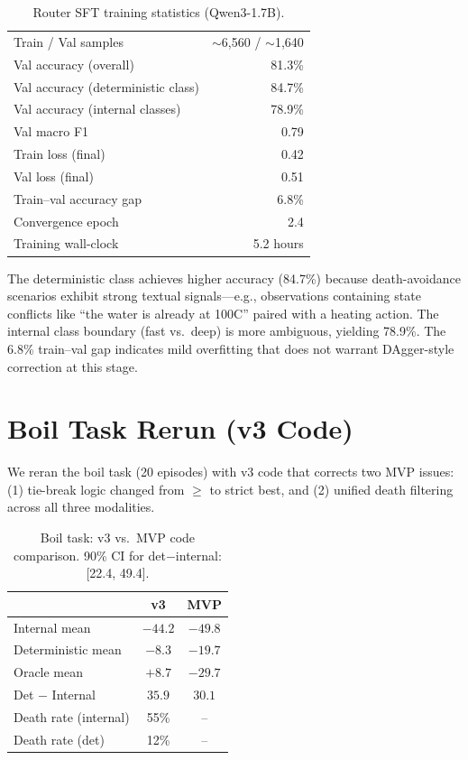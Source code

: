 \documentclass[11pt,a4paper]{article}
\begin{document}
\begin{table}[h]
\centering
\small
\begin{tabular}{lr}
\toprule
Train / Val samples & $\sim$6,560 / $\sim$1,640 \\
Val accuracy (overall) & 81.3\% \\
Val accuracy (deterministic class) & 84.7\% \\
Val accuracy (internal classes) & 78.9\% \\
Val macro F1 & 0.79 \\
Train loss (final) & 0.42 \\
Val loss (final) & 0.51 \\
Train--val accuracy gap & 6.8\% \\
Convergence epoch & 2.4 \\
Training wall-clock & 5.2 hours \\
\bottomrule
\end{tabular}
\caption{Router SFT training statistics (Qwen3-1.7B).}
\label{tab:router_training}
\end{table}

The deterministic class achieves higher accuracy (84.7\%) because death-avoidance scenarios exhibit strong textual signals---e.g., observations containing state conflicts like ``the water is already at 100\textdegree{}C'' paired with a heating action.
The internal class boundary (fast vs.\ deep) is more ambiguous, yielding 78.9\%.
The 6.8\% train--val gap indicates mild overfitting that does not warrant DAgger-style correction at this stage.

\section{Boil Task Rerun (v3 Code)}
\label{app:boil}

We reran the boil task (20 episodes) with v3 code that corrects two MVP issues: (1) tie-break logic changed from $\geq$ to strict best, and (2) unified death filtering across all three modalities.

\begin{table}[h]
\centering
\small
\begin{tabular}{lcc}
\toprule
& \textbf{v3} & \textbf{MVP} \\
\midrule
Internal mean & $-44.2$ & $-49.8$ \\
Deterministic mean & $-8.3$ & $-19.7$ \\
Oracle mean & $+8.7$ & $-29.7$ \\
Det $-$ Internal & $35.9$ & $30.1$ \\
Death rate (internal) & 55\% & -- \\
Death rate (det) & 12\% & -- \\
\bottomrule
\end{tabular}
\caption{Boil task: v3 vs.\ MVP code comparison. 90\% CI for det$-$internal: [22.4, 49.4].}
\label{tab:boil_rerun}
\end{table}
\end{document}
